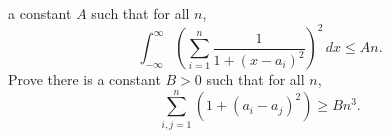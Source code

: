 a constant $A$ such that for all $n$,
\[
\int_{-\infty}^\infty \left( \sum_{i=1}^n \frac{1}{1 + (x-a_i)^2} \right)^2\,dx \leq An.
\]
Prove there is a constant $B>0$ such that for all $n$,
\[
\sum_{i,j=1}^n (1 + (a_i - a_j)^2) \geq Bn^3.
\]
